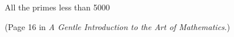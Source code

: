 \documentclass{article}
\begin{document}
\thispagestyle{empty}
\centerline{\Large All the primes less than 5000}
\centerline{(Page 16 in {\em A Gentle Introduction to the Art of Mathematics}.)}

\vfill

\begin{center}

\end{center}
\end{document}
